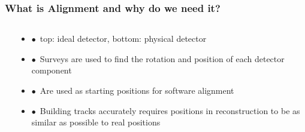 \documentclass[aspectratio=1610, 12pt]{beamer}
\begin{document}
\begin{frame}\frametitle{What is Alignment and why do we need it?}
  \begin{columns}
    \begin{column}[c]{0.48\textwidth}
      
    \end{column}
    \begin{column}[c]{0.48\textwidth}
      \begin{itemize}
        \item $\bullet$\, top: ideal detector, bottom: physical detector
        \item $\bullet$\, Surveys are used to find the rotation and position of each detector component
        \item $\bullet$\, Are used as starting positions for software alignment
        \item $\bullet$\, Building tracks accurately requires positions in reconstruction to be as similar as possible to real positions
      \end{itemize}
    \end{column}
  \end{columns}
\end{frame}
\end{document}
